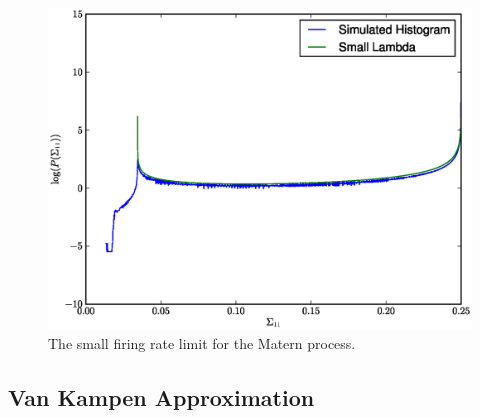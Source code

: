 \begin{figure}
\label{fig:matern_histograms}
\includegraphics[width=\columnwidth]{figures/matern_histogram.eps}
\caption[Distribution of variances in the limit of small firing rates.]{The small firing rate limit for the Matern process.}
\end{figure}

\subsection{Van Kampen Approximation}


